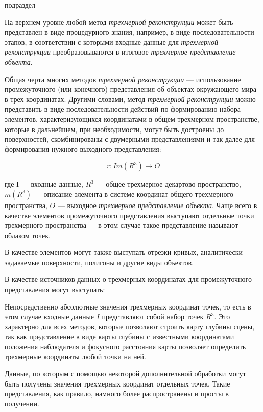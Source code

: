 \begin{scnrelfromlist}{подраздел}
\end{scnrelfromlist}

На верхнем уровне любой метод \textit{трехмерной реконструкции} может быть представлен в виде процедурного знания, например, в виде последовательности этапов, в соответствии с которыми входные данные для \textit{трехмерной реконструкции} преобразовываются в итоговое \textit{трехмерное представление объекта}.

Общая черта многих методов \textit{трехмерной реконструкции} --- использование промежуточного (или конечного) представления об объектах окружающего мира в трех координатах. Другими словами, метод \textit{трехмерной реконструкции} можно представить в виде последовательности действий по формированию набора элементов, характеризующихся координатами в общем трехмерном пространстве, которые в дальнейшем, при необходимости, могут быть достроены до поверхностей, скомбинированы с двумерными представлениями и так далее для формирования нужного выходного представления:

\begin{equation}
    r:I{m(R^3)}\rightarrow O
\end{equation}

где I --- входные данные, $R^3$ --- общее трехмерное декартово пространство, $m(R^3)$ --- описание элемента в системе координат общего трехмерного пространства, $O$ --- выходное \textit{трехмерное представление объекта}. Чаще всего в качестве элементов промежуточного представления выступают отдельные точки трехмерного пространства --- в этом случае такое представление называют облаком точек.

В качестве элементов могут также выступать отрезки кривых, аналитически задаваемые поверхности, полигоны и другие виды объектов.

В качестве источников данных о трехмерных координатах для промежуточного представления могут выступать:
\begin{textitemize}
    \item Непосредственно абсолютные значения трехмерных координат точек, то есть в этом случае входные данные $I$ представляют собой набор точек ${R^3}$. Это характерно для всех методов, которые позволяют строить карту глубины сцены, так как представление в виде карты глубины с известными координатами положения наблюдателя и фокусного расстояния карты позволяет определить трехмерные координаты любой точки на ней.
    \item Данные, по которым с помощью некоторой дополнительной обработки могут быть получены значения трехмерных координат отдельных точек. Такие представления, как правило, намного более распространены и просты в получении.
\end{textitemize}

